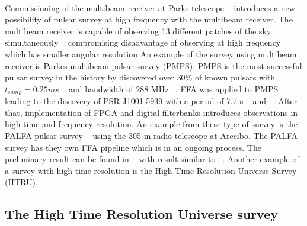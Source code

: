 \documentclass[thesis_msc.tex]{subfiles}
\begin{document}
        \paragraph{} Commissioning of the multibeam receiver at Parks telescope ~\citep{staveley1997hi} introduces a new possibility of pulsar survey at high frequency with the multibeam receiver. The multibeam receiver is capable of observing 13 different patches of the sky simultaneously ~\citep{staveley1997hi} compromising disadvantage of observing at high frequency which has smaller angular resolution An example of the survey using multibeam receiver is Parkes multibeam pulsar survey (PMPS). PMPS is the most successful pulsar survey in the history by discovered over $30 \%$ of known pulsars with $t_{samp}=0.25 ms$ ~\cite{camilo2000parkes} and bandwidth of $288$ MHz  ~\cite{manchester2001parkes}. FFA was applied to PMPS leading to the discovery of PSR J1001-5939 with a period of 7.7 s ~\citep{Faulkner2004} and ~\citep{lorimer2006parkes}. After that, implementation of FPGA and digital filterbanks introduces observations in high time and frequency resolution. An example from these type of survey is the PALFA pulsar survey ~\citep{cordes2006arecibo} using the 305 m radio telescope at Arecibo. The PALFA survey has they own FFA pipeline which is in an ongoing process. The preliminary result can be found in  ~\cite{parent2018implementation} with result similar to ~\cite{cameron2017investigation}. Another example of a survey with high time resolution is the High Time Resolution Universe Survey (HTRU).
        
        \subsection{The High Time Resolution Universe survey}
\end{document}

